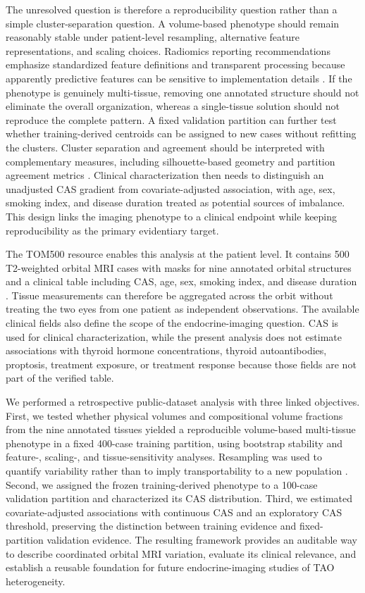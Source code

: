 \documentclass[utf8]{FrontiersinVancouver}
\begin{document}
The unresolved question is therefore a reproducibility question rather than a simple cluster-separation question. A volume-based phenotype should remain reasonably stable under patient-level resampling, alternative feature representations, and scaling choices. Radiomics reporting recommendations emphasize standardized feature definitions and transparent processing because apparently predictive features can be sensitive to implementation details \citep{zwanenburg2020,vangriethuysen2017}. If the phenotype is genuinely multi-tissue, removing one annotated structure should not eliminate the overall organization, whereas a single-tissue solution should not reproduce the complete pattern. A fixed validation partition can further test whether training-derived centroids can be assigned to new cases without refitting the clusters. Cluster separation and agreement should be interpreted with complementary measures, including silhouette-based geometry and partition agreement metrics \citep{rousseeuw1987,hubert1985}. Clinical characterization then needs to distinguish an unadjusted CAS gradient from covariate-adjusted association, with age, sex, smoking index, and disease duration treated as potential sources of imbalance. This design links the imaging phenotype to a clinical endpoint while keeping reproducibility as the primary evidentiary target.

The TOM500 resource enables this analysis at the patient level. It contains 500 T2-weighted orbital MRI cases with masks for nine annotated orbital structures and a clinical table including CAS, age, sex, smoking index, and disease duration \citep{zhang2025tom500}. Tissue measurements can therefore be aggregated across the orbit without treating the two eyes from one patient as independent observations. The available clinical fields also define the scope of the endocrine-imaging question. CAS is used for clinical characterization, while the present analysis does not estimate associations with thyroid hormone concentrations, thyroid autoantibodies, proptosis, treatment exposure, or treatment response because those fields are not part of the verified table.

We performed a retrospective public-dataset analysis with three linked objectives. First, we tested whether physical volumes and compositional volume fractions from the nine annotated tissues yielded a reproducible volume-based multi-tissue phenotype in a fixed 400-case training partition, using bootstrap stability and feature-, scaling-, and tissue-sensitivity analyses. Resampling was used to quantify variability rather than to imply transportability to a new population \citep{efron1993}. Second, we assigned the frozen training-derived phenotype to a 100-case validation partition and characterized its CAS distribution. Third, we estimated covariate-adjusted associations with continuous CAS and an exploratory CAS threshold, preserving the distinction between training evidence and fixed-partition validation evidence. The resulting framework provides an auditable way to describe coordinated orbital MRI variation, evaluate its clinical relevance, and establish a reusable foundation for future endocrine-imaging studies of TAO heterogeneity.
\end{document}
